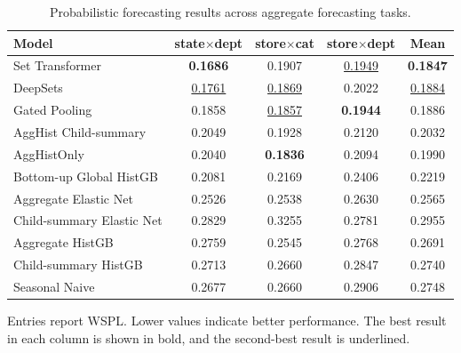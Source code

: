 \documentclass[12pt]{article}
\begin{document}
\begin{table}[H]
  \centering
  \caption{Probabilistic forecasting results across aggregate forecasting tasks.}
  \label{tab:main_quantile}
  \begin{threeparttable}
    \begin{tabular}{lcccc}
      \toprule
      Model                     & state$\times$dept  & store$\times$cat   & store$\times$dept  & Mean               \\
      \midrule
      Set Transformer                   & \textbf{0.1686}    & 0.1907             & \underline{0.1949} & \textbf{0.1847}    \\
      DeepSets                  & \underline{0.1761} & \underline{0.1869} & 0.2022             & \underline{0.1884} \\
      Gated Pooling                  & 0.1858             & \underline{0.1857} & \textbf{0.1944}    & 0.1886             \\
      AggHist Child-summary   & 0.2049             & 0.1928             & 0.2120             & 0.2032             \\
      AggHistOnly               & 0.2040             & \textbf{0.1836}    & 0.2094             & 0.1990             \\
      Bottom-up Global HistGB  & 0.2081	     &0.2169	            &0.2406	             &0.2219             \\
      Aggregate Elastic Net     & 0.2526             & 0.2538             & 0.2630             & 0.2565             \\
      Child-summary Elastic Net & 0.2829             & 0.3255             & 0.2781             & 0.2955             \\
      Aggregate HistGB          & 0.2759             & 0.2545             & 0.2768             & 0.2691             \\
      Child-summary HistGB      & 0.2713             & 0.2660             & 0.2847             & 0.2740             \\
      Seasonal Naive            & 0.2677             & 0.2660             & 0.2906             & 0.2748             \\
      \bottomrule
    \end{tabular}
    \begin{tablenotes}
      \footnotesize \item Entries report WSPL. Lower values indicate better performance. The best result in each column is shown in bold, and the second-best result is underlined.
    \end{tablenotes}
  \end{threeparttable}
\end{table}
\end{document}
